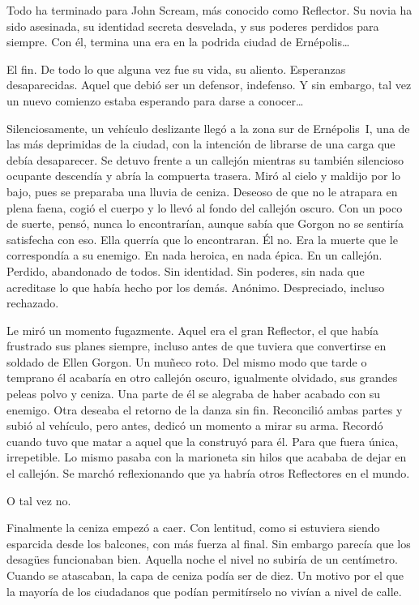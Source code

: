 \begin{prev}
    Todo ha terminado para John Scream, más conocido como Reflector. Su novia ha sido asesinada, su identidad secreta desvelada, y sus poderes perdidos para siempre. Con él, termina una era en la podrida ciudad de Ernépolis\dots
\end{prev}

\noindent
El fin. De todo lo que alguna vez fue su vida, su aliento. Esperanzas desaparecidas. Aquel que debió ser un defensor, indefenso. Y sin embargo, tal vez un nuevo comienzo estaba esperando para darse a conocer\dots

\bigskip\noindent
Silenciosamente, un vehículo deslizante llegó a la zona sur de Ernépolis~I, una de las más deprimidas de la ciudad, con la intención de librarse de una carga que debía desaparecer. Se detuvo frente a un callejón mientras su también silencioso ocupante descendía y abría la compuerta trasera. Miró al cielo y maldijo por lo bajo, pues se preparaba una lluvia de ceniza. Deseoso de que no le atrapara en plena faena, cogió el cuerpo y lo llevó al fondo del callejón oscuro. Con un poco de suerte, pensó, nunca lo encontrarían, aunque sabía que Gorgon no se sentiría satisfecha con eso. Ella querría que lo encontraran. Él no. Era la muerte que le correspondía a su enemigo. En nada heroica, en nada épica. En un callejón. Perdido, abandonado de todos. Sin identidad. Sin poderes, sin nada que acreditase lo que había hecho por los demás. Anónimo. Despreciado, incluso rechazado.

Le miró un momento fugazmente. Aquel era el gran Reflector, el que había frustrado sus planes siempre, incluso antes de que tuviera que convertirse en soldado de Ellen Gorgon. Un muñeco roto. Del mismo modo que tarde o temprano él acabaría en otro callejón oscuro, igualmente olvidado, sus grandes peleas polvo y ceniza. Una parte de él se alegraba de haber acabado con su enemigo. Otra deseaba el retorno de la danza sin fin. Reconcilió ambas partes y subió al vehículo, pero antes, dedicó un momento a mirar su arma. Recordó cuando tuvo que matar a aquel que la construyó para él. Para que fuera única, irrepetible. Lo mismo pasaba con la marioneta sin hilos que acababa de dejar en el callejón. Se marchó reflexionando que ya habría otros Reflectores en el mundo.

O tal vez no.

Finalmente la ceniza empezó a caer. Con lentitud, como si estuviera siendo esparcida desde los balcones, con más fuerza al final. Sin embargo parecía que los desagües funcionaban bien. Aquella noche el nivel no subiría de un centímetro. Cuando se atascaban, la capa de ceniza podía ser de diez. Un motivo por el que la mayoría de los ciudadanos que podían permitírselo no vivían a nivel de calle.

